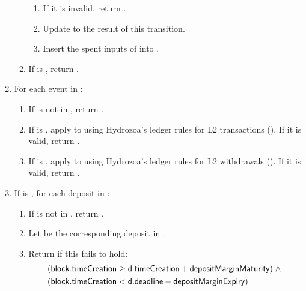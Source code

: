 \documentclass[../hydrozoa.tex]{subfiles}
\begin{document}
\begin{enumerate}
\begin{enumerate}
        \begin{enumerate}
          \item If it is invalid, return .
          \item Update  to the result of this transition.
          \item Insert the spent inputs of  into .
        \end{enumerate}
      \item If  is , return .
    \end{enumerate}
  \item For each event  in :
    \begin{enumerate}
      \item If  is not in , return .
      \item If  is , apply  to  using Hydrozoa's ledger rules for L2 transactions ().
      If it is valid, return .
      \item If  is , apply  to  using Hydrozoa's ledger rules for L2 withdrawals ().
      If it is valid, return .
    \end{enumerate}
  \item If  is , for each deposit  in :
    \begin{enumerate}
      \item If  is not in , return .
      \item Let  be the corresponding deposit in .
      \item Return  if this fails to hold:
        \begin{equation*}
        \begin{split}
          &(\mathsf{block.timeCreation} \geq \mathsf{d.timeCreation} + \mathsf{depositMarginMaturity}) \;\land\;\\
          &(\mathsf{block.timeCreation} < \mathsf{d.deadline} - \mathsf{depositMarginExpiry})
        \end{split}
        \end{equation*}

\end{enumerate}
\end{enumerate}
\end{document}
